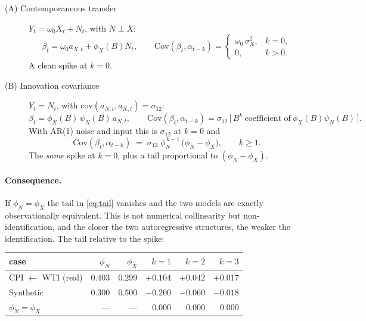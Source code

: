 \documentclass[11pt,a4paper]{article}
\theoremstyle{plain}
\theoremstyle{remark}
\begin{document}
\begin{description}
\item[(A) Contemporaneous transfer] $Y_t = \omega_0 X_t + N_t$, with $N \perp X$:
\[
\beta_t = \omega_0 a_{X,t} + \phi_X(B) N_t,
\qquad
\mathrm{Cov}(\beta_t,\alpha_{t-k}) =
\begin{cases}
\omega_0\,\sigma_X^2, & k=0,\\[2pt]
0, & k>0 .
\end{cases}
\]
A clean spike at $k=0$.

\item[(B) Innovation covariance] $Y_t = N_t$, with
$\mathrm{cov}(a_{N,t}, a_{X,t}) = \sigma_{12}$:
\[
\beta_t = \phi_X(B)\,\psi_N(B)\,a_{N,t},
\qquad
\mathrm{Cov}(\beta_t,\alpha_{t-k})
 = \sigma_{12}\,\bigl[\,B^k\ \text{coefficient of}\ \phi_X(B)\psi_N(B)\,\bigr].
\]
With AR(1) noise and input this is $\sigma_{12}$ at $k=0$ and
\begin{equation}
\boxed{\;
\mathrm{Cov}(\beta_t,\alpha_{t-k}) \;=\;
\sigma_{12}\;\phi_N^{\,k-1}\,\bigl(\phi_N - \phi_X\bigr),
\qquad k \ge 1 .\;}
\label{eq:tail}
\end{equation}
The \emph{same} spike at $k=0$, plus a tail proportional to
$(\phi_N - \phi_X)$.
\end{description}

\paragraph{Consequence.} If $\phi_N = \phi_X$ the tail in \eqref{eq:tail}
vanishes and the two models are exactly observationally equivalent. This is not
numerical collinearity but non-identification, and the closer the two
autoregressive structures, the weaker the identification. The tail relative to the
spike:

\begin{center}
\begin{tabular}{lrrrrr}
\toprule
case & $\phi_N$ & $\phi_X$ & $k=1$ & $k=2$ & $k=3$ \\
\midrule
CPI $\leftarrow$ WTI (real) & $0.403$ & $0.299$ & $\mathbf{+0.104}$ & $+0.042$ & $+0.017$ \\
Synthetic                   & $0.300$ & $0.500$ & $-0.200$ & $-0.060$ & $-0.018$ \\
$\phi_N = \phi_X$           & ---     & ---     & $\mathbf{0.000}$ & $0.000$ & $0.000$ \\
\bottomrule
\end{tabular}
\end{center}
\end{document}
